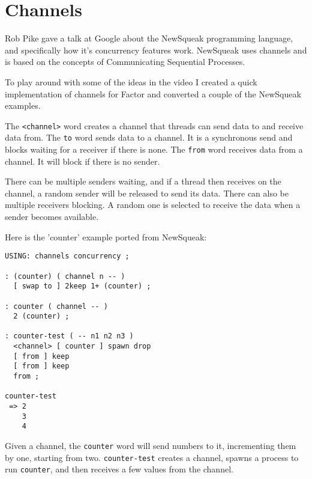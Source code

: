 \chapter{Channels}\label{channels}

Rob Pike gave a talk at Google about the NewSqueak programming
language, and specifically how it's concurrency features
work. NewSqueak uses channels and is based on the concepts of
Communicating Sequential Processes.

To play around with some of the ideas in the video I created a quick implementation of channels for Factor and converted a couple of the NewSqueak examples.


The \texttt{<channel>} word creates a channel that threads can send data to and
receive data from. The \texttt{to} word sends data to a channel. It is a
synchronous send and blocks waiting for a receiver if there is
none. The \texttt{from} word receives data from a channel. It will block if
there is no sender.

There can be multiple senders waiting, and if a thread then receives
on the channel, a random sender will be released to send its
data. There can also be multiple receivers blocking. A random one is
selected to receive the data when a sender becomes available.

Here is the 'counter' example ported from NewSqueak:

\begin{verbatim}
USING: channels concurrency ;

: (counter) ( channel n -- )
  [ swap to ] 2keep 1+ (counter) ;
    
: counter ( channel -- )
  2 (counter) ;    

: counter-test ( -- n1 n2 n3 )
  <channel> [ counter ] spawn drop 
  [ from ] keep 
  [ from ] keep 
  from ;

counter-test 
 => 2
    3
    4
\end{verbatim}

Given a channel, the \texttt{counter} word will send numbers to it,
incrementing them by one, starting from two. \texttt{counter-test} creates a
channel, spawns a process to run \texttt{counter}, and then receives a few
values from the channel.

